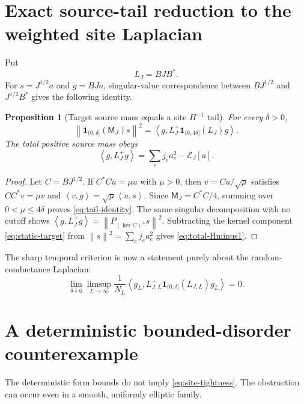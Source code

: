 \documentclass[11pt]{article}
\newtheorem{proposition}[theorem]{Proposition}
\theoremstyle{definition}
\theoremstyle{remark}
\newcommand{\cE}{\mathcal E}
\newcommand{\ip}[2]{\left\langle #1,#2\right\rangle}
\newcommand{\norm}[1]{\left\lVert #1\right\rVert}
\begin{document}
\section{Exact source-tail reduction to the weighted site Laplacian}
\label{sec:source-tail}

Put
\begin{equation}
 L_J=BJB^*.
 \label{eq:site-lap}
\end{equation}
For $s=J^{1/2}a$ and $g=BJa$, singular-value correspondence between
$BJ^{1/2}$ and $J^{1/2}B^*$ gives the following identity.

\begin{proposition}[Target source mass equals a site $H^{-1}$ tail]
\label{prop:tail-identity}
For every $\delta>0$,
\begin{equation}
 \boxed{
 \norm{\bm{1}_{(0,\delta]}(\mathsf M_J)s}^2
 =\ip g{L_J^+\bm{1}_{(0,4\delta]}(L_J)g}.}
 \label{eq:tail-identity}
\end{equation}
The total positive source mass obeys
\begin{equation}
 \boxed{
 \ip g{L_J^+g}
 =\sum_ej_ea_e^2-\cE_J[a].}
 \label{eq:total-Hminus1}
\end{equation}
\end{proposition}

\begin{proof}
Let $C=BJ^{1/2}$.  If $C^*Cu=\mu u$ with $\mu>0$, then $v=Cu/\sqrt\mu$ satisfies $CC^*v=\mu v$ and
$\ip v g=\sqrt\mu\ip u s$.  Since $\mathsf M_J=C^*C/4$, summing over $0<\mu\le4\delta$ proves \eqref{eq:tail-identity}.  The same singular decomposition with no cutoff shows
$\ip g{L_J^+g}=\norm{P_{(\ker C)^\perp}s}^2$.  Subtracting the kernel component \eqref{eq:static-target} from $\norm s^2=\sum_ej_ea_e^2$ gives \eqref{eq:total-Hminus1}.
\end{proof}

The sharp temporal criterion is now a statement purely about the random-conductance Laplacian:
\begin{equation}
 \lim_{\delta\downarrow0}\limsup_{L\to\infty}
 \frac1{N_L}\ip{g_L}{L_{J,L}^+
 \bm{1}_{(0,\delta]}(L_{J,L})g_L}=0.
 \label{eq:site-tightness}
\end{equation}

\section{A deterministic bounded-disorder counterexample}
\label{sec:counterexample}

The deterministic form bounds do not imply \eqref{eq:site-tightness}.  The obstruction can occur even in a smooth, uniformly elliptic family.
\end{document}
